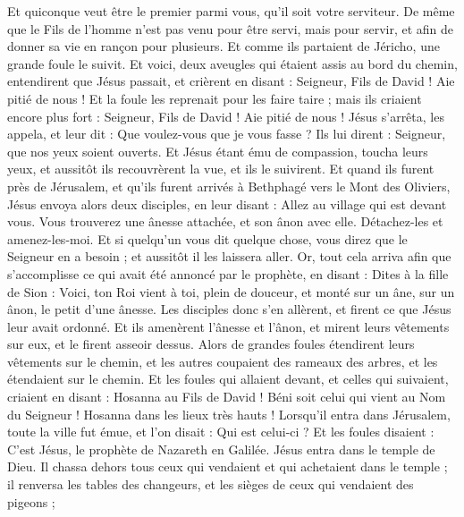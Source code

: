\begin{multicols}{2}
Et quiconque veut être le premier parmi vous, qu'il soit votre serviteur.
De même que le Fils de l'homme n'est pas venu pour être servi, mais pour servir, et afin de donner sa vie en rançon pour plusieurs.
Et comme ils partaient de Jéricho, une grande foule le suivit.
Et voici, deux aveugles qui étaient assis au bord du chemin, entendirent que Jésus passait, et crièrent en disant : Seigneur, Fils de David ! Aie pitié de nous !
Et la foule les reprenait pour les faire taire ; mais ils criaient encore plus fort : Seigneur, Fils de David ! Aie pitié de nous !
Jésus s'arrêta, les appela, et leur dit : Que voulez-vous que je vous fasse ?
Ils lui dirent : Seigneur, que nos yeux soient ouverts.
Et Jésus étant ému de compassion, toucha leurs yeux, et aussitôt ils recouvrèrent la vue, et ils le suivirent.
\VerseOne{}Et quand ils furent près de Jérusalem, et qu'ils furent arrivés à Bethphagé vers le Mont des Oliviers, Jésus envoya alors deux disciples,
en leur disant : Allez au village qui est devant vous. Vous trouverez une ânesse attachée, et son ânon avec elle. Détachez-les et amenez-les-moi.
Et si quelqu'un vous dit quelque chose, vous direz que le Seigneur en a besoin ; et aussitôt il les laissera aller.
Or, tout cela arriva afin que s'accomplisse ce qui avait été annoncé par le prophète, en disant :
Dites à la fille de Sion : Voici, ton Roi vient à toi, plein de douceur, et monté sur un âne, sur un ânon, le petit d'une ânesse.
Les disciples donc s'en allèrent, et firent ce que Jésus leur avait ordonné.
Et ils amenèrent l'ânesse et l'ânon, et mirent leurs vêtements sur eux, et le firent asseoir dessus.
Alors de grandes foules étendirent leurs vêtements sur le chemin, et les autres coupaient des rameaux des arbres, et les étendaient sur le chemin.
Et les foules qui allaient devant, et celles qui suivaient, criaient en disant : Hosanna au Fils de David ! Béni soit celui qui vient au Nom du Seigneur ! Hosanna dans les lieux très hauts !
Lorsqu'il entra dans Jérusalem, toute la ville fut émue, et l'on disait : Qui est celui-ci ?
Et les foules disaient : C'est Jésus, le prophète de Nazareth en Galilée.
Jésus entra dans le temple de Dieu. Il chassa dehors tous ceux qui vendaient et qui achetaient dans le temple ; il renversa les tables des changeurs, et les sièges de ceux qui vendaient des pigeons ;

\end{multicols}
